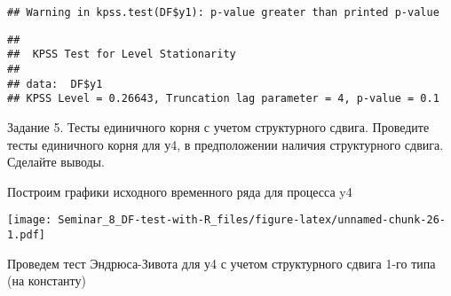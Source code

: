\documentclass[
]{article}
\newenvironment{Shaded}{\begin{snugshade}}{\end{snugshade}}
\newcommand{\AttributeTok}[1]{\textcolor[rgb]{0.13,0.29,0.53}{#1}}
\newcommand{\CommentTok}[1]{\textcolor[rgb]{0.56,0.35,0.01}{\textit{#1}}}
\newcommand{\FunctionTok}[1]{\textcolor[rgb]{0.13,0.29,0.53}{\textbf{#1}}}
\newcommand{\NormalTok}[1]{#1}
\newcommand{\SpecialCharTok}[1]{\textcolor[rgb]{0.81,0.36,0.00}{\textbf{#1}}}
\newcommand{\StringTok}[1]{\textcolor[rgb]{0.31,0.60,0.02}{#1}}
\begin{document}
\begin{Shaded}
\end{Shaded}

\begin{verbatim}
## Warning in kpss.test(DF$y1): p-value greater than printed p-value
\end{verbatim}

\begin{verbatim}
## 
##  KPSS Test for Level Stationarity
## 
## data:  DF$y1
## KPSS Level = 0.26643, Truncation lag parameter = 4, p-value = 0.1
\end{verbatim}

\begin{Shaded}
\end{Shaded}

Задание 5. Тесты единичного корня с учетом структурного сдвига.
Проведите тесты единичного корня для у4, в предположении наличия
структурного сдвига. Сделайте выводы.

Построим графики исходного временного ряда для процесса y4

\begin{Shaded}
\end{Shaded}

\texttt{[image: Seminar\_8\_DF-test-with-R\_files/figure-latex/unnamed-chunk-26-1.pdf]}

Проведем тест Эндрюса-Зивота для у4 с учетом структурного сдвига 1-го
типа (на константу)

\begin{Shaded}
\end{Shaded}
\end{document}
